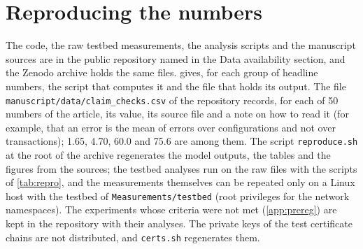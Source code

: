 \documentclass[preprint,12pt]{elsarticle}
\begin{document}
\FloatBarrier
\section{Reproducing the numbers}
\label{app:repro}
The code, the raw testbed measurements, the analysis scripts and the manuscript sources are in the public repository named in the Data availability section, and the Zenodo archive holds the same files.  gives, for each group of headline numbers, the script that computes it and the file that holds its output. The file \texttt{manuscript/data/claim\_checks.csv} of the repository records, for each of 50 numbers of the article, its value, its source file and a note on how to read it (for example, that an error is the mean of errors over configurations and not over transactions); 1.65, 4.70, 60.0 and 75.6 are among them. The script \texttt{reproduce.sh} at the root of the archive regenerates the model outputs, the tables and the figures from the sources; the testbed analyses run on the raw files with the scripts of \cref{tab:repro}, and the measurements themselves can be repeated only on a Linux host with the testbed of \texttt{Measurements/testbed} (root privileges for the network namespaces). The experiments whose criteria were not met (\cref{app:prereg}) are kept in the repository with their analyses. The private keys of the test certificate chains are not distributed, and \texttt{certs.sh} regenerates them.
\end{document}
